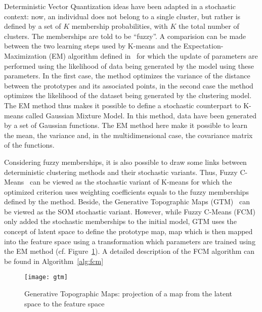  Deterministic Vector Quantization ideas have been adapted in a stochastic 
 context: now, an individual does not belong to a single cluster, but rather is 
 defined by a set of $K$ membership probabilities, with $K$ the total number of 
 clusters.  The memberships are told to be ``fuzzy''. A comparision can be made 
 between the two learning steps used by K-means and the Expectation-Maximization 
 (EM) algorithm defined in~\cite{dempster1977maximum} for which the update of 
 parameters are performed using the likelihood of data being generated by the 
 model using these parameters. In the first case, the method optimizes the 
 variance of the distance between the prototypes and its associated points, in 
 the second case the method optimizes the likelihood of the dataset being 
 generated by the clustering model. The EM method thus makes it possible to 
 define a stochastic counterpart to K-means called Gaussian Mixture Model. In 
 this method, data have been generated by a set of Gaussian functions. The EM 
 method here make it possible to learn the mean, the variance and, in the 
 multidimensional case, the covariance matrix of the functions.
    
 Considering fuzzy memberships, it is also possible to draw some links between deterministic clustering methods and their stochastic variants. Thus, Fuzzy C-Means~\cite{bezdek1984fcm} can be viewed as the stochastic variant of K-means for which the optimized criterion uses weighting coefficients equals to the fuzzy memberships defined by the method. Beside, the Generative Topographic Maps (GTM)~\cite{bishop1998gtm} can be viewed as the SOM stochastic variant. However, while Fuzzy C-Means (FCM) only added the stochastic memberships to the initial model, GTM uses the concept of latent space to define the prototype map, map which is then mapped into the feature space using a transformation which parameters are trained using the EM method (cf. Figure~\ref{fig:gtm}). A detailed description of the FCM algorithm can be found in Algorithm~\ref{alg:fcm}

        \vspace{0.8cm}
   
        \begin{figure}[h]
            \centering
            \texttt{[image: gtm]}
            \caption{Generative Topographic Maps: projection of a map from the latent space to the feature space}
\label{fig:gtm}
        \end{figure}

